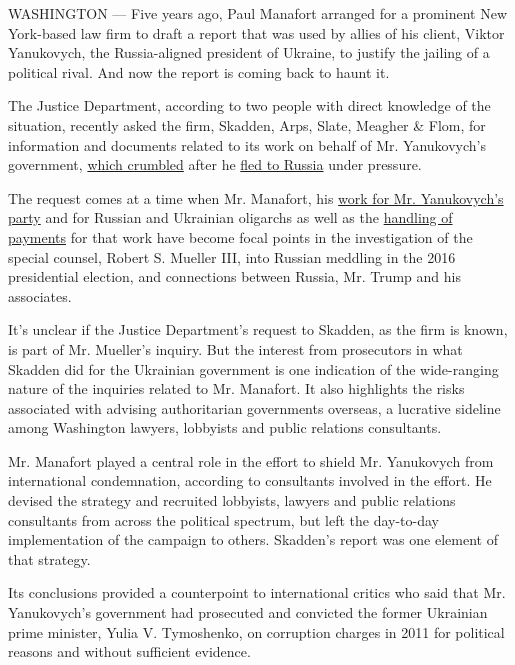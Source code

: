WASHINGTON --- Five years ago, Paul Manafort arranged for a prominent
New York-based law firm to draft a report that was used by allies of his
client, Viktor Yanukovych, the Russia-aligned president of Ukraine, to
justify the jailing of a political rival. And now the report is coming
back to haunt it.

The Justice Department, according to two people with direct knowledge of
the situation, recently asked the firm, Skadden, Arps, Slate, Meagher \&
Flom, for information and documents related to its work on behalf of Mr.
Yanukovych's government,
\href{https://www.nytimes.com/2014/02/23/world/europe/ukraine.html}{which
crumbled} after he
\href{https://www.nytimes.com/2016/11/25/world/europe/yanukovych-ukraine-maidan-protests-russia.html}{fled
to Russia} under pressure.

The request comes at a time when Mr. Manafort, his
\href{https://www.nytimes.com/2016/08/01/us/paul-manafort-ukraine-donald-trump.html?mcubz=3}{work
for Mr. Yanukovych's party} and for Russian and Ukrainian oligarchs as
well as the
\href{https://www.nytimes.com/2017/07/15/world/europe/ukraine-paul-manafort-viktor-yanukovych.html?mcubz=3}{handling
of payments} for that work have become focal points in the investigation
of the special counsel, Robert S. Mueller III, into Russian meddling in
the 2016 presidential election, and connections between Russia, Mr.
Trump and his associates.

It's unclear if the Justice Department's request to Skadden, as the firm
is known, is part of Mr. Mueller's inquiry. But the interest from
prosecutors in what Skadden did for the Ukrainian government is one
indication of the wide-ranging nature of the inquiries related to Mr.
Manafort. It also highlights the risks associated with advising
authoritarian governments overseas, a lucrative sideline among
Washington lawyers, lobbyists and public relations consultants.

Mr. Manafort played a central role in the effort to shield Mr.
Yanukovych from international condemnation, according to consultants
involved in the effort. He devised the strategy and recruited lobbyists,
lawyers and public relations consultants from across the political
spectrum, but left the day-to-day implementation of the campaign to
others. Skadden's report was one element of that strategy.

Its conclusions provided a counterpoint to international critics who
said that Mr. Yanukovych's government had prosecuted and convicted the
former Ukrainian prime minister, Yulia V. Tymoshenko, on corruption
charges in 2011 for political reasons and without sufficient evidence.

